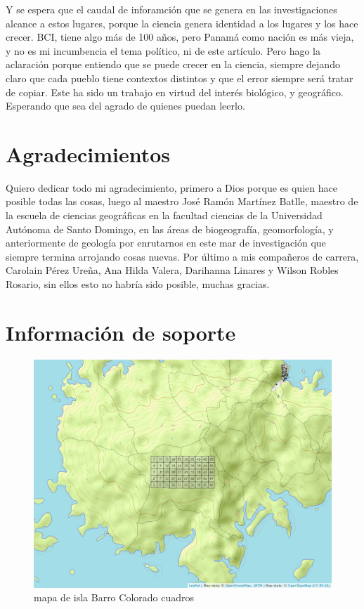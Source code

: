 \documentclass[11pt,]{article}
\begin{document}
Y se espera que el caudal de inforamción que se genera en las
investigaciones alcance a estos lugares, porque la ciencia genera
identidad a los lugares y los hace crecer. BCI, tiene algo más de 100
años, pero Panamá como nación es más vieja, y no es mi incumbencia el
tema político, ni de este artículo. Pero hago la aclaración porque
entiendo que se puede crecer en la ciencia, siempre dejando claro que
cada pueblo tiene contextos distintos y que el error siempre será tratar
de copiar. Este ha sido un trabajo en virtud del interés biológico, y
geográfico. Esperando que sea del agrado de quienes puedan leerlo.

\section{Agradecimientos}\label{agradecimientos}

Quiero dedicar todo mi agradecimiento, primero a Dios porque es quien
hace posible todas las cosas, luego al maestro José Ramón Martínez
Batlle, maestro de la escuela de ciencias geográficas en la facultad
ciencias de la Universidad Autónoma de Santo Domingo, en las áreas de
biogeografía, geomorfología, y anteriormente de geología por enrutarnos
en este mar de investigación que siempre termina arrojando cosas nuevas.
Por último a mis compañeros de carrera, Carolain Pérez Ureña, Ana Hilda
Valera, Darihanna Linares y Wilson Robles Rosario, sin ellos esto no
habría sido posible, muchas gracias.

\section{Información de soporte}\label{informaciuxf3n-de-soporte}

\begin{figure}
\centering
\includegraphics[width=1.00000\textwidth]{mapa_cuadros.png}
\caption{mapa de isla Barro Colorado cuadros\label{fig:bci_map}}
\end{figure}
\end{document}
